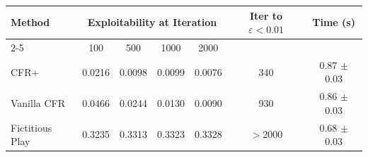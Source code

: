 \begin{tabular}{lcccccc}
\toprule
Method & \multicolumn{4}{c}{Exploitability at Iteration} & Iter to $\varepsilon < 0.01$ & Time (s) \\
\cmidrule(lr){2-5}
 & 100 & 500 & 1000 & 2000 & & \\
\midrule
CFR+ & 0.0216 & 0.0098 & 0.0099 & 0.0076 & 340 & 0.87 $\pm$ 0.03 \\
Vanilla CFR & 0.0466 & 0.0244 & 0.0130 & 0.0090 & 930 & 0.86 $\pm$ 0.03 \\
Fictitious Play & 0.3235 & 0.3313 & 0.3323 & 0.3328 & $>$2000 & 0.68 $\pm$ 0.03 \\
\bottomrule
\end{tabular}